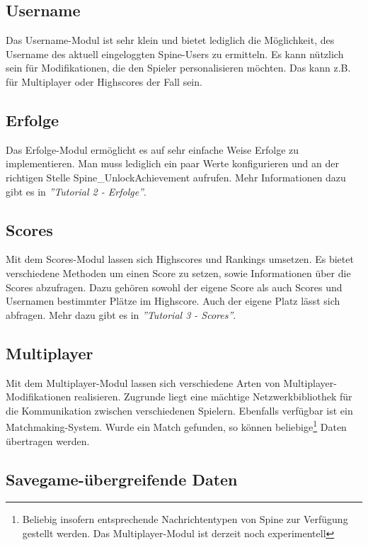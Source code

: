 \documentclass{article}
\begin{document}
\subsection{Username}

Das Username-Modul ist sehr klein und bietet lediglich die Möglichkeit, des Username des aktuell eingeloggten Spine-Users zu ermitteln. Es kann nützlich sein für Modifikationen, die den Spieler personalisieren möchten. Das kann z.B. für Multiplayer oder Highscores der Fall sein.

\subsection{Erfolge}

Das Erfolge-Modul ermöglicht es auf sehr einfache Weise Erfolge zu implementieren. Man muss lediglich ein paar Werte konfigurieren und an der richtigen Stelle Spine\_UnlockAchievement aufrufen. Mehr Informationen dazu gibt es in \textit{''Tutorial 2 - Erfolge''}.

\subsection{Scores}

Mit dem Scores-Modul lassen sich Highscores und Rankings umsetzen. Es bietet verschiedene Methoden um einen Score zu setzen, sowie Informationen über die Scores abzufragen. Dazu gehören sowohl der eigene Score als auch Scores und Usernamen bestimmter Plätze im Highscore. Auch der eigene Platz lässt sich abfragen. Mehr dazu gibt es in \textit{''Tutorial 3 - Scores''}.

\subsection{Multiplayer}

Mit dem Multiplayer-Modul lassen sich verschiedene Arten von Multiplayer-Modifikationen realisieren. Zugrunde liegt eine mächtige Netzwerkbibliothek für die Kommunikation zwischen verschiedenen Spielern. Ebenfalls verfügbar ist ein Matchmaking-System. Wurde ein Match gefunden, so können beliebige\footnote{Beliebig insofern entsprechende Nachrichtentypen von Spine zur Verfügung gestellt werden. Das Multiplayer-Modul ist derzeit noch experimentell} Daten übertragen werden.

\subsection{Savegame-übergreifende Daten}
\end{document}
